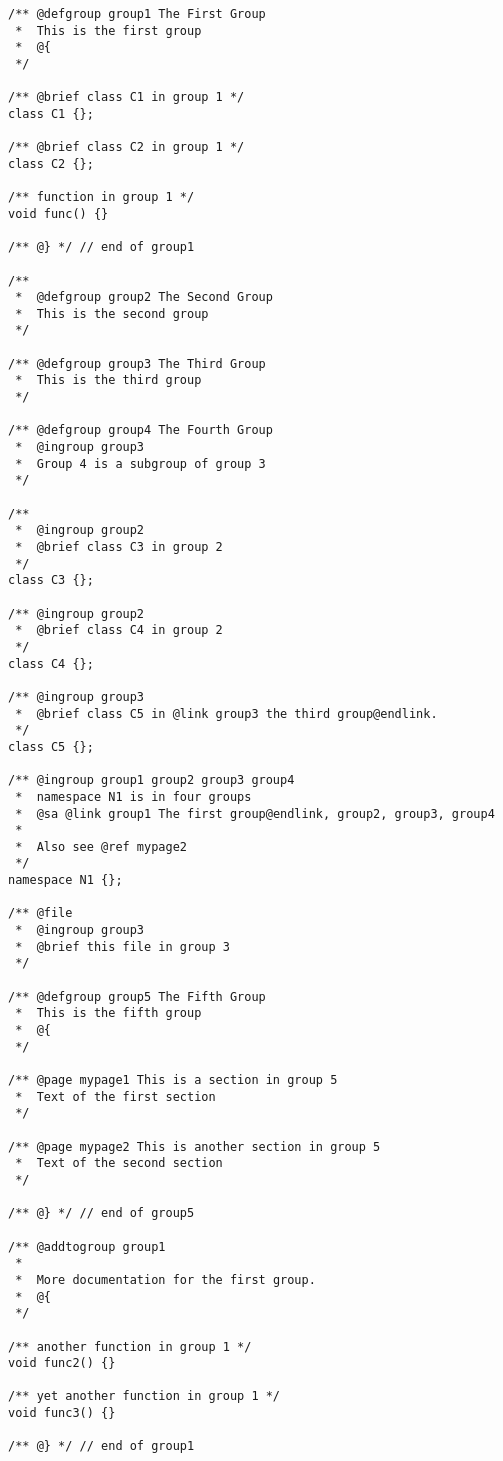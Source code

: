\begin{Desc}
\item[Example:]

\begin{VerbInclude}\begin{verbatim}/** @defgroup group1 The First Group
 *  This is the first group
 *  @{
 */

/** @brief class C1 in group 1 */
class C1 {};

/** @brief class C2 in group 1 */
class C2 {};

/** function in group 1 */
void func() {}

/** @} */ // end of group1

/**
 *  @defgroup group2 The Second Group
 *  This is the second group
 */

/** @defgroup group3 The Third Group
 *  This is the third group
 */

/** @defgroup group4 The Fourth Group
 *  @ingroup group3
 *  Group 4 is a subgroup of group 3
 */

/**
 *  @ingroup group2
 *  @brief class C3 in group 2
 */
class C3 {};

/** @ingroup group2
 *  @brief class C4 in group 2
 */
class C4 {};

/** @ingroup group3
 *  @brief class C5 in @link group3 the third group@endlink.
 */
class C5 {};

/** @ingroup group1 group2 group3 group4
 *  namespace N1 is in four groups
 *  @sa @link group1 The first group@endlink, group2, group3, group4 
 *
 *  Also see @ref mypage2
 */
namespace N1 {};

/** @file
 *  @ingroup group3
 *  @brief this file in group 3
 */

/** @defgroup group5 The Fifth Group
 *  This is the fifth group
 *  @{
 */

/** @page mypage1 This is a section in group 5
 *  Text of the first section
 */

/** @page mypage2 This is another section in group 5
 *  Text of the second section
 */

/** @} */ // end of group5

/** @addtogroup group1
 *  
 *  More documentation for the first group.
 *  @{
 */

/** another function in group 1 */
void func2() {}

/** yet another function in group 1 */
void func3() {}

/** @} */ // end of group1

\end{verbatim}
\end{VerbInclude}
\end{Desc}
